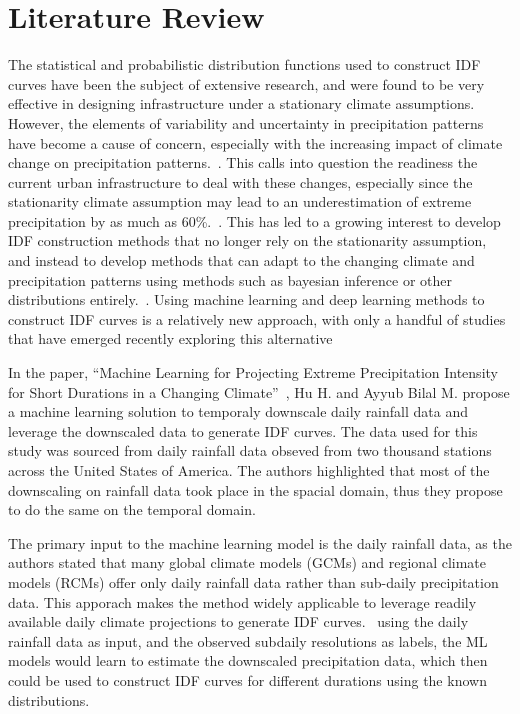 \section{Literature Review}
The statistical and probabilistic distribution functions used to construct IDF curves have been the subject of extensive research, and were found to be very effective in designing infrastructure under a stationary climate assumptions. However, the elements of variability and uncertainty in precipitation patterns have become a cause of concern, especially with the increasing impact of climate change on precipitation patterns.~\cite{Cheng2014}. This calls into question the readiness the current urban infrastructure to deal with these changes, especially since the stationarity climate assumption may lead to an underestimation of extreme precipitation by as much as 60\%.~\cite{Cheng2014}. This has led to a growing interest to develop IDF construction methods that no longer rely on the stationarity assumption, and instead to develop methods that can adapt to the changing climate and precipitation patterns using methods such as bayesian inference or other distributions entirely.~\cite{Cheng2014}\cite{hess-2020-173}\cite{hess-27-2075-2023}\cite{hess-25-6133-2021}. Using machine learning and deep learning methods to construct IDF curves is a relatively new approach, with only a handful of studies that have emerged recently exploring this alternative~\cite{idfkoya}

\vspace{1em}



\vspace{1em}

In the paper, ``Machine Learning for Projecting Extreme Precipitation Intensity for Short Durations in a Changing Climate''~\cite{geosciences9050209}, Hu H. and Ayyub Bilal M. propose a machine learning solution to temporaly downscale daily rainfall data and leverage the downscaled data to generate IDF curves. The data used for this study was sourced from daily rainfall data obseved from two thousand stations across the United States of America. The authors highlighted that most of the downscaling on rainfall data took place in the spacial domain, thus they propose to do the same on the temporal domain.~\cite{geosciences9050209}

The primary input to the machine learning model is the daily rainfall data, as the authors stated that many global climate models (GCMs) and regional climate models (RCMs) offer only daily rainfall data rather than sub-daily precipitation data. This apporach makes the method widely applicable to leverage readily available daily climate projections to generate IDF curves.~\cite{geosciences9050209} using the daily rainfall data as input, and the observed subdaily resolutions as labels, the ML models would learn to estimate the downscaled precipitation data, which then could be used to construct IDF curves for different durations using the known distributions.

